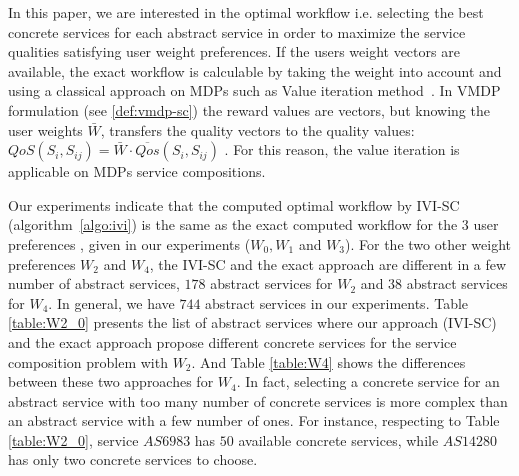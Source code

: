 \documentclass[10pt,journal,compsoc]{IEEEtran}
\begin{document}

In this paper, we are interested in the optimal workflow i.e. selecting the best concrete services for each abstract service in order to maximize the service qualities satisfying user weight preferences. If the users weight vectors are available, the exact workflow is calculable by taking the weight into account and using a classical approach on MDPs such as Value iteration method~\cite{sutton1998,ARASI2017}. %
In VMDP formulation (see \ref{def:vmdp-sc}) the reward values are vectors, but knowing the user weights $\bar{W}$, transfers the quality vectors to the quality values: $QoS(S_i, S_{ij}) = \bar{W} \cdot \overline{Qos}(S_i, S_{ij})$ . For this reason, the value iteration is applicable on MDPs service compositions.


Our experiments indicate that the computed optimal workflow by IVI-SC (algorithm~\ref{algo:ivi}) is the same as the exact computed workflow for the $3$ user preferences , given in our experiments ($W_0, W_1$ and $W_3$). For the two other weight preferences $W_2$ and $W_4$, the IVI-SC and the exact approach are different in a few number of abstract services, $178$ abstract services for $W_2$ and $38$ abstract services for $W_4$. 
In general, we have $744$ abstract services in our experiments. Table \ref{table:W2_0} presents the list of abstract services where our approach (IVI-SC) and the exact approach propose different concrete services for the service composition problem with $W_2$. And Table \ref{table:W4} shows the differences between these two approaches for $W_4$. In fact, selecting a concrete service for an abstract service with too many number of concrete services is more complex than an abstract service with a few number of ones. For instance, respecting to Table \ref{table:W2_0}, service $AS6983$ has $50$ available concrete services, while $AS14280$ has only two concrete services to choose.
\end{document}
